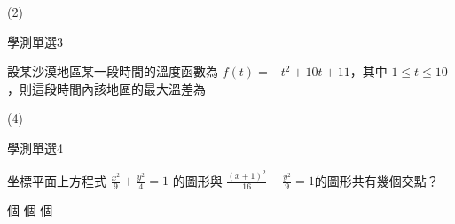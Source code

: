 \begin{QUESTIONS}
\begin{QUESTION}
        \begin{QTAGS}\end{QTAGS}
        \begin{QANS}
            (2)
        \end{QANS}
        \begin{QSOLLIST}
        \end{QSOLLIST}
        \begin{QEMPTYSPACE}
        \end{QEMPTYSPACE}
    \end{QUESTION}
    \begin{QUESTION}
        \begin{ExamInfo}{96}{學測}{單選}{3}
        \end{ExamInfo}
        \begin{ExamAnsRateInfo}{58}{88}{62}{24}
        \end{ExamAnsRateInfo}
        \begin{QBODY}
            設某沙漠地區某一段時間的溫度函數為 $f(t) = -t^2 +10t +11$，其中 $1 \leq  t \leq 10$ ，則這段時間內該地區的最大溫差為
			\begin{QOPS} 
			\end{QOPS}
        \end{QBODY}
        \begin{QFROMS}
        \end{QFROMS}
        \begin{QTAGS}\end{QTAGS}
        \begin{QANS}
            (4)
        \end{QANS}
        \begin{QSOLLIST}
        \end{QSOLLIST}
        \begin{QEMPTYSPACE}
        \end{QEMPTYSPACE}
    \end{QUESTION}
    \begin{QUESTION}
        \begin{ExamInfo}{96}{學測}{單選}{4}
        \end{ExamInfo}
        \begin{ExamAnsRateInfo}{47}{78}{46}{17}
        \end{ExamAnsRateInfo}
        \begin{QBODY}
            坐標平面上方程式 $\frac{x^2}{9} + \frac{y^2}{4} =1$ 的圖形與 $\frac{(x+1)^2}{16} - \frac{y^2}{9}=1$的圖形共有幾個交點？ 
			\begin{QOPS} 
				\QOP 1 個 
				\QOP 2 個 
				\QOP 3 個


\end{QOPS}
\end{QBODY}
\end{QUESTION}
\end{QUESTIONS}
